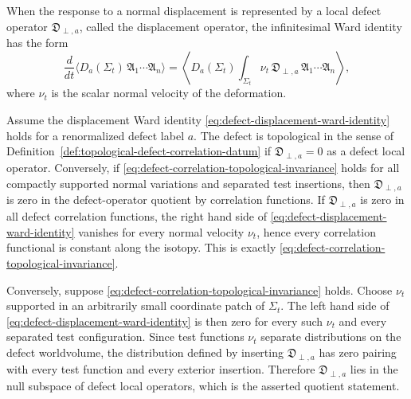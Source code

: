 When the response to a normal displacement is represented by a local defect
operator \(\mathfrak D_{\perp,a}\), called the displacement operator, the
infinitesimal Ward identity has the form
\begin{equation}
  \frac{d}{dt}
  \bigl\langle D_a(\Sigma_t)\,\mathfrak A_1\cdots\mathfrak A_n\bigr\rangle
  =
  \left\langle
    D_a(\Sigma_t)
    \int_{\Sigma_t}\nu_t\,\mathfrak D_{\perp,a}\,
    \mathfrak A_1\cdots\mathfrak A_n
  \right\rangle ,
  \label{eq:defect-displacement-ward-identity}
\end{equation}
where \(\nu_t\) is the scalar normal velocity of the deformation.

\begin{remark}
\label{rem:displacement-criterion-topological-defect}
Assume the displacement Ward identity
\eqref{eq:defect-displacement-ward-identity} holds for a renormalized defect
label \(a\).  The defect is topological in the sense of
Definition~\ref{def:topological-defect-correlation-datum} if
\(\mathfrak D_{\perp,a}=0\) as a defect local operator.  Conversely, if
\eqref{eq:defect-correlation-topological-invariance} holds for all compactly
supported normal variations and separated test insertions, then
\(\mathfrak D_{\perp,a}\) is zero in the defect-operator quotient by
correlation functions.
If \(\mathfrak D_{\perp,a}\) is zero in all defect correlation functions, the
right hand side of
\eqref{eq:defect-displacement-ward-identity} vanishes for every normal
velocity \(\nu_t\), hence every correlation functional is constant along the
isotopy.  This is exactly
\eqref{eq:defect-correlation-topological-invariance}.

Conversely, suppose
\eqref{eq:defect-correlation-topological-invariance} holds.  Choose
\(\nu_t\) supported in an arbitrarily small coordinate patch of \(\Sigma_t\).
The left hand side of
\eqref{eq:defect-displacement-ward-identity} is then zero for every such
\(\nu_t\) and every separated test configuration.  Since test functions
\(\nu_t\) separate distributions on the defect worldvolume, the distribution
defined by inserting \(\mathfrak D_{\perp,a}\) has zero pairing with every
test function and every exterior insertion.  Therefore
\(\mathfrak D_{\perp,a}\) lies in the null subspace of defect local
operators, which is the asserted quotient statement.
\end{remark}

